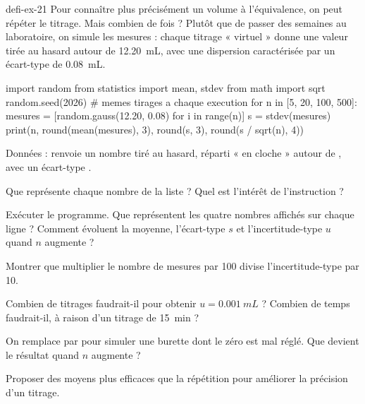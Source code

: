 \begin{blocEdition}{defi-ex-21}
Pour connaître plus précisément un volume à l'équivalence, on peut répéter le titrage. Mais combien de fois ? Plutôt que de passer des
semaines au laboratoire, on simule les mesures : chaque titrage « virtuel » donne une valeur tirée au hasard autour de \qty{12,20}{mL},
avec une dispersion caractérisée par un écart-type de \qty{0,08}{mL}.
\begin{python}
import random
from statistics import mean, stdev
from math import sqrt
random.seed(2026)                    # memes tirages a chaque execution
for n in [5, 20, 100, 500]:
    mesures = [random.gauss(12.20, 0.08) for i in range(n)]
    s = stdev(mesures)
    print(n, round(mean(mesures), 3), round(s, 3), round(s / sqrt(n), 4))
\end{python}
Données :  renvoie un nombre tiré au hasard, réparti « en cloche » autour de , avec un écart-type .
\begin{questions}
\item Que représente chaque nombre de la liste  ? Quel est l'intérêt de l'instruction  ?
\item Exécuter le programme. Que représentent les quatre nombres affichés sur chaque ligne ? Comment évoluent la moyenne, l'écart-type $s$ et
l'incertitude-type $u$ quand $n$ augmente ?
\item Montrer que multiplier le nombre de mesures par 100 divise l'incertitude-type par 10.
\item Combien de titrages faudrait-il pour obtenir $u=\qty{0,001}{mL}$ ? Combien de temps faudrait-il, à raison d'un titrage de \qty{15}{min} ?
\item On remplace  par  pour simuler une burette dont le zéro est mal réglé. Que devient le résultat quand $n$ augmente ?
\item Proposer des moyens plus efficaces que la répétition pour améliorer la précision d'un titrage.
\end{questions}
\end{blocEdition}
